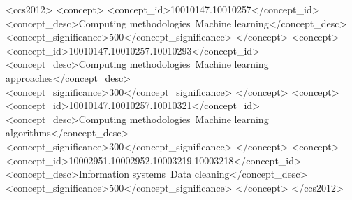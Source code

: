 \documentclass[acmsmall]{acmart}
\begin{document}
\begin{CCSXML}
	<ccs2012>
	   <concept>
		   <concept_id>10010147.10010257</concept_id>
		   <concept_desc>Computing methodologies~Machine learning</concept_desc>
		   <concept_significance>500</concept_significance>
		   </concept>
	   <concept>
		   <concept_id>10010147.10010257.10010293</concept_id>
		   <concept_desc>Computing methodologies~Machine learning approaches</concept_desc>
		   <concept_significance>300</concept_significance>
		   </concept>
	   <concept>
		   <concept_id>10010147.10010257.10010321</concept_id>
		   <concept_desc>Computing methodologies~Machine learning algorithms</concept_desc>
		   <concept_significance>300</concept_significance>
		   </concept>
	   <concept>
		   <concept_id>10002951.10002952.10003219.10003218</concept_id>
		   <concept_desc>Information systems~Data cleaning</concept_desc>
		   <concept_significance>500</concept_significance>
		   </concept>
	 </ccs2012>
\end{CCSXML}




\maketitle











	
\clearpage

%
\normalem


\end{document}
